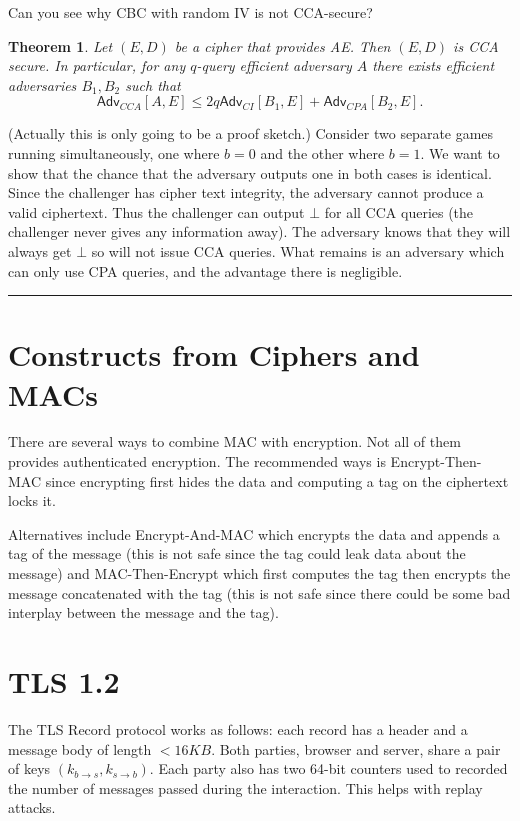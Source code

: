 \documentclass[twoside]{article}
\newcounter{lecnum}
\newtheorem{theorem}{Theorem}[lecnum]
\newenvironment{proof}{{\bf Proof:}}{\hfill\rule{2mm}{2mm}}
\def\Adv{\mathsf{Adv}}
\begin{document}
Can you see why CBC with random IV is not CCA-secure?

\begin{theorem}
Let $(E, D)$ be a cipher that provides AE. Then $(E, D)$ is CCA secure. In particular, for any $q$-query efficient adversary $A$ there exists efficient adversaries $B_1, B_2$ such that
\[\Adv_{CCA}[A, E] \leq 2q\Adv_{CI}[B_1, E] + \Adv_{CPA}[B_2, E].\]
\end{theorem}
\begin{proof}
(Actually this is only going to be a proof sketch.) Consider two separate games running simultaneously, one where $b = 0$ and the other where $b = 1$. We want to show that the chance that the adversary outputs one in both cases is identical. Since the challenger has cipher text integrity, the adversary cannot produce a valid ciphertext. Thus the challenger can output $\bot$ for all CCA queries (the challenger never gives any information away). The adversary knows that they will always get $\bot$ so will not issue CCA queries.  What remains is an adversary which can only use CPA queries, and the advantage there is negligible.
\end{proof}

\section{Constructs from Ciphers and MACs}

There are several ways to combine MAC with encryption. Not all of them provides authenticated encryption. The recommended ways is Encrypt-Then-MAC since encrypting first hides the data and computing a tag on the ciphertext locks it.

Alternatives include Encrypt-And-MAC which encrypts the data and appends a tag of the message (this is not safe since the tag could leak data about the message) and MAC-Then-Encrypt which first computes the tag then encrypts the message concatenated with the tag (this is not safe since there could be some bad interplay between the message and the tag). 

\section{TLS 1.2}
The TLS Record protocol works as follows: each record has a header and a message body of length $< 16 KB$. Both parties, browser and server, share a pair of keys $(k_{b \rightarrow s}, k_{s \rightarrow b})$. Each party also has two 64-bit counters used to recorded the number of messages passed during the interaction. This helps with replay attacks.
\end{document}
